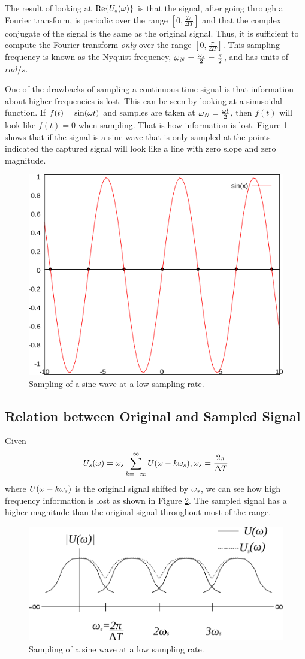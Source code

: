 The result of looking at $\text{Re}\{U_s(\omega)\}$ is that the signal, after going through a Fourier transform, is periodic over the range $[0, \frac{2\pi}{\Delta T}]$ and that the complex conjugate of the signal is the same as the original signal. Thus, it is sufficient to compute the Fourier transform \textit{only} over the range $[0, \frac{\pi}{\Delta T}]$. This sampling frequency is known as the Nyquist frequency, $\omega_N = \frac{\omega_s}{2} = \frac{\pi}{2}$, and has units of $rad/s$.

One of the drawbacks of sampling a continuous-time signal is that information about higher frequencies is lost. This can be seen by looking at a sinusoidal function. If $f(t) = \sin(\omega t)$ and samples are taken at $\omega_N = \frac{\omega t}{2}$, then $f(t)$ will look like $f(t) = 0$ when sampling. That is how information is lost. Figure \ref{fig:02lowSampleRate} shows that if the signal is a sine wave that is only sampled at the points indicated the captured signal will look like a line with zero slope and zero magnitude.
\begin{figure}[ht!]
	\centering
	\includegraphics[width=.3\textwidth]{images/02lowSampleRate}
	\caption{Sampling of a sine wave at a low sampling rate.}
	\label{fig:02lowSampleRate}
\end{figure}

\subsection{Relation between Original and Sampled Signal}
Given
$$U_s(\omega) = \omega_s \sum_{k=-\infty}^\infty U(\omega-k\omega_s), \omega_s = \frac{2\pi}{\Delta T}$$
where $U(\omega-k\omega_s)$ is the original signal shifted by $\omega_s$, we can see how high frequency information is lost as shown in Figure \ref{fig:02freqResp}. The sampled signal has a higher magnitude than the original signal throughout most of the range.
\begin{figure}[ht!]
	\centering
	\includegraphics[width=.4\textwidth]{images/02freqResp}
	\caption{Sampling of a sine wave at a low sampling rate.}
	\label{fig:02freqResp}
\end{figure}

